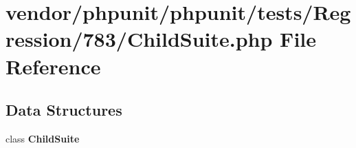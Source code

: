 \section{vendor/phpunit/phpunit/tests/\+Regression/783/\+Child\+Suite.php File Reference}
\label{_child_suite_8php}
\subsection*{Data Structures}
\begin{DoxyCompactItemize}
\item 
class {\bf Child\+Suite}
\end{DoxyCompactItemize}
